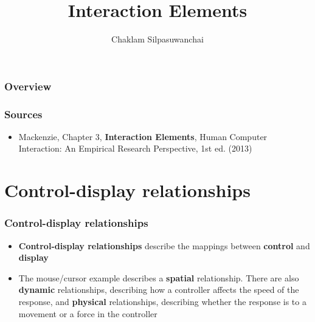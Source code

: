 \documentclass{beamer}
\title[Interaction Elements]{Interaction Elements} %
\author{Chaklam Silpasuwanchai} %
\institute[AIT] %
{
Asian Institute of Technology \\ %
\medskip
\textit{chaklam@ait.asia} %
}
\date{} %
\begin{document}
\begin{frame}
\titlepage %
\end{frame}

\begin{frame}
\frametitle{Overview} %
\tableofcontents %
\end{frame}



\begin{frame}
\frametitle{Sources} 
\begin{itemize}
	\item Mackenzie, Chapter 3, \textbf{Interaction Elements},  Human Computer Interaction: An Empirical Research Perspective, 1st ed. (2013) 
\end{itemize}
\end{frame}

\section{Control-display relationships}

\begin{frame}
	\frametitle{Control-display relationships}
	\begin{itemize}
		\item \textbf{Control-display relationships} describe the mappings between \textbf{control} and \textbf{display}
		\item The mouse/cursor example describes a \textbf{spatial} relationship. There are also \textbf{dynamic} relationships, describing how a controller affects the speed of the response, and \textbf{physical} relationships, describing whether the response is to a movement or a force in the controller
	\end{itemize}
\end{frame}
\end{document}
